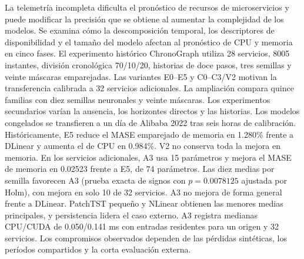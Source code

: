 La telemetría incompleta dificulta el pronóstico de recursos de microservicios y puede modificar la precisión que se obtiene al aumentar la complejidad de los modelos. Se examina cómo la descomposición temporal, los descriptores de disponibilidad y el tamaño del modelo afectan al pronóstico de CPU y memoria en cinco fases. El experimento histórico ChronoGraph utiliza 28 servicios, 8005 instantes, división cronológica 70/10/20, historias de doce pasos, tres semillas y veinte máscaras emparejadas. Las variantes E0--E5 y C0--C3/V2 motivan la transferencia calibrada a 32 servicios adicionales. La ampliación compara quince familias con diez semillas neuronales y veinte máscaras. Los experimentos secundarios varían la ausencia, los horizontes directos y las historias. Los modelos congelados se transfieren a un día de Alibaba 2022 tras seis horas de calibración. Históricamente, E5 reduce el MASE emparejado de memoria en 1.280\% frente a DLinear y aumenta el de CPU en 0.984\%. V2 no conserva toda la mejora en memoria. En los servicios adicionales, A3 usa 15 parámetros y mejora el MASE de memoria en 0.02523 frente a E5, de 74 parámetros. Las diez medias por semilla favorecen A3 (prueba exacta de signos con $p=0.0078125$ ajustada por Holm), con mejora en solo 10 de 32 servicios. A3 no mejora de forma general frente a DLinear. PatchTST pequeño y NLinear obtienen las menores medias principales, y persistencia lidera el caso externo. A3 registra medianas CPU/CUDA de 0.050/0.141 ms con entradas residentes para un origen y 32 servicios. Los compromisos observados dependen de las pérdidas sintéticas, los períodos compartidos y la corta evaluación externa.
